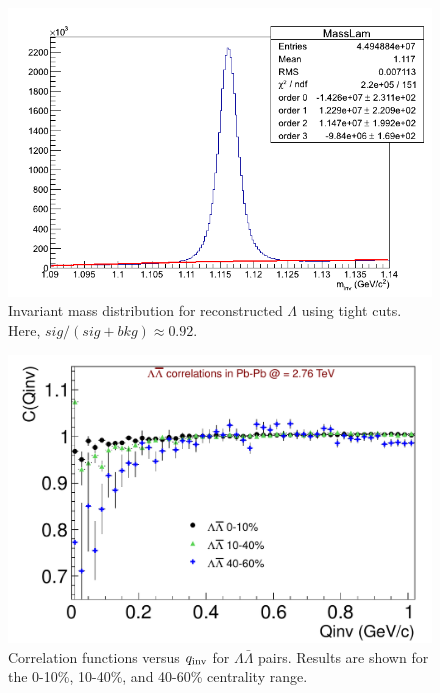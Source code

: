 \begin{figure}[hbtp]
\includegraphics[scale=0.5]{11h_V0_MassLam_TightCuts.png}
\caption[Invariant mass distribution for reconstructed $\Lambda$ using tight cuts]{Invariant mass distribution for reconstructed $\Lambda$ using tight cuts.  Here, $sig/(sig+bkg) \approx 0.92$.}
\label{fig:MassTightCut}
\end{figure}
		


\begin{figure}[hbtp]
\includegraphics[scale=0.7]{LamALamCF_LooseCuts.pdf}
\caption[Correlation functions versus $q_{\rm inv}$ for $\Lambda\bar{\Lambda}$ pairs in three centrality ranges.]{Correlation functions versus $q_{\rm inv}$ for $\Lambda\bar{\Lambda}$ pairs.  Results are shown for the 0-10\%, 10-40\%, and 40-60\% centrality range.}
\label{fig:CFMixCentralities}
\end{figure}

